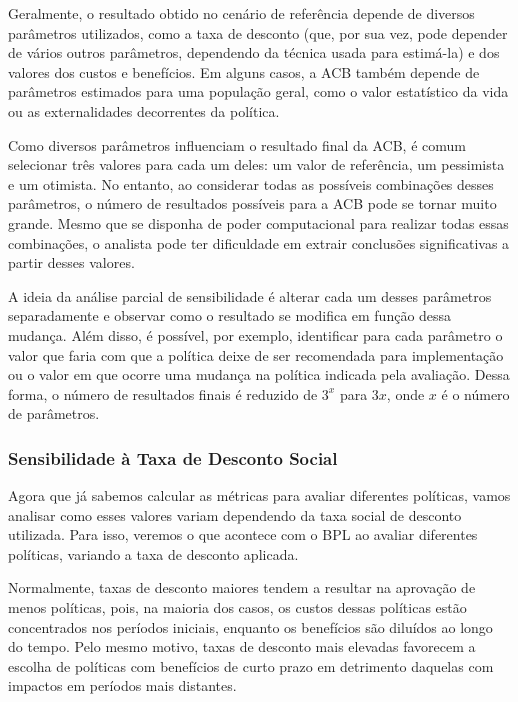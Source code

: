 \documentclass[12pt,letterpaper]{article}
\newcommand{\1}{\mathbbm{1}}
\numberwithin{equation}{section}
\begin{document}
Geralmente, o resultado obtido no cenário de referência depende de diversos parâmetros utilizados, como a taxa de desconto (que, por sua vez, pode depender de vários outros parâmetros, dependendo da técnica usada para estimá-la) e dos valores dos custos e benefícios. Em alguns casos, a ACB também depende de parâmetros estimados para uma população geral, como o valor estatístico da vida ou as externalidades decorrentes da política.

Como diversos parâmetros influenciam o resultado final da ACB, é comum selecionar três valores para cada um deles: um valor de referência, um pessimista e um otimista. No entanto, ao considerar todas as possíveis combinações desses parâmetros, o número de resultados possíveis para a ACB pode se tornar muito grande. Mesmo que se disponha de poder computacional para realizar todas essas combinações, o analista pode ter dificuldade em extrair conclusões significativas a partir desses valores.

A ideia da análise parcial de sensibilidade é alterar cada um desses parâmetros separadamente e observar como o resultado se modifica em função dessa mudança. Além disso, é possível, por exemplo, identificar para cada parâmetro o valor que faria com que a política deixe de ser recomendada para implementação ou o valor em que ocorre uma mudança na política indicada pela avaliação. Dessa forma, o número de resultados finais é reduzido de $3^x$ para $3x$, onde $x$ é o número de parâmetros.

\subsubsection{Sensibilidade à Taxa de Desconto Social}
\label{sec:sensibilidadetds}

Agora que já sabemos calcular as métricas para avaliar diferentes políticas, vamos analisar como esses valores variam dependendo da taxa social de desconto utilizada. Para isso, veremos o que acontece com o BPL ao avaliar diferentes políticas, variando a taxa de desconto aplicada.

Normalmente, taxas de desconto maiores tendem a resultar na aprovação de menos políticas, pois, na maioria dos casos, os custos dessas políticas estão concentrados nos períodos iniciais, enquanto os benefícios são diluídos ao longo do tempo. Pelo mesmo motivo, taxas de desconto mais elevadas favorecem a escolha de políticas com benefícios de curto prazo em detrimento daquelas com impactos em períodos mais distantes.
\end{document}
